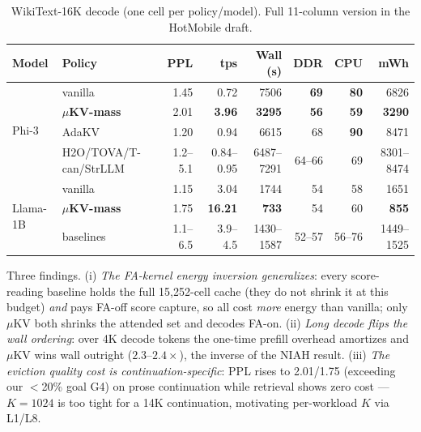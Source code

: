\documentclass[sigconf, anonymous=false, screen=true]{acmart}
\newcommand{\good}[1]{\textcolor{endurkvgreen}{\textbf{#1}}}
\newcommand{\bad}[1]{\textcolor{endurkvred}{\textbf{#1}}}
\begin{document}
\begin{table}[h]
\caption{WikiText-16K decode (one cell per policy/model). Full 11-column version in the HotMobile draft.}
\label{tab:campaign-wikitext}
\centering\small
\setlength{\tabcolsep}{3.5pt}
\begin{tabular}{l l r r r r r r}
\toprule
\textbf{Model} & \textbf{Policy} & \textbf{PPL} & \textbf{tps} & \textbf{Wall (s)} & \textbf{DDR} & \textbf{CPU} & \textbf{mWh} \\
\midrule
\multirow{4}{*}{Phi-3}
 & vanilla    & 1.45 & 0.72 & 7506 & \bad{69} & \bad{80} & 6826 \\
 & \textbf{$\mu$KV-mass} & 2.01 & \good{3.96} & \good{3295} & \good{56} & \good{59} & \good{3290} \\
 & AdaKV      & 1.20 & 0.94 & 6615 & 68 & \bad{90} & 8471 \\
 & H2O/TOVA/T-can/StrLLM & 1.2--5.1 & 0.84--0.95 & 6487--7291 & 64--66 & 69 & 8301--8474 \\
\midrule
\multirow{3}{*}{Llama-1B}
 & vanilla    & 1.15 & 3.04 & 1744 & 54 & 58 & 1651 \\
 & \textbf{$\mu$KV-mass} & 1.75 & \good{16.21} & \good{733} & 54 & 60 & \good{855} \\
 & baselines  & 1.1--6.5 & 3.9--4.5 & 1430--1587 & 52--57 & 56--76 & 1449--1525 \\
\bottomrule
\end{tabular}
\end{table}

Three findings. (i) \emph{The FA-kernel energy inversion generalizes}: every score-reading baseline holds the full 15{,}252-cell cache (they do not shrink it at this budget) \emph{and} pays FA-off score capture, so all cost \emph{more} energy than vanilla; only $\mu$KV both shrinks the attended set and decodes FA-on. (ii) \emph{Long decode flips the wall ordering}: over 4K decode tokens the one-time prefill overhead amortizes and $\mu$KV wins wall outright ($2.3$--$2.4\times$), the inverse of the NIAH result. (iii) \emph{The eviction quality cost is continuation-specific}: PPL rises to 2.01/1.75 (exceeding our $<$20\% goal G4) on prose continuation while retrieval shows zero cost --- $K{=}1024$ is too tight for a 14K continuation, motivating per-workload $K$ via L1/L8.
\end{document}
